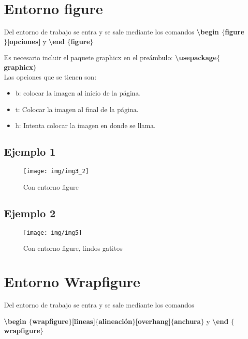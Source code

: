 \documentclass[11pt,letterpaper]{article}
\begin{document}
	\section{Entorno figure}
	Del entorno de trabajo se entra y se sale mediante los comandos \textbf{\textbackslash 		begin $\lbrace$figure$\rbrace$[opciones]} y \textbf{\textbackslash end $\lbrace$figure$		\rbrace$}
	
	Es necesario incluir el paquete graphicx en el preámbulo: \textbf{\textbackslash 			usepackage$\lbrace$graphicx$\rbrace$} \\
	
	Las opciones que se tienen son:
	\begin{itemize}
		\item b: colocar la imagen al inicio de la página. 
		\item t: Colocar la imagen al final de la página.
		\item h: Intenta colocar la imagen en donde se llama. 
	\end{itemize}
	
	\subsection{Ejemplo 1}
	\begin{figure}[h]
		\centering %
		\caption{Con entorno figure}
		\texttt{[image: img/img3\_2]}
	\end{figure}
	
	\subsection{Ejemplo 2}
	\begin{figure}[h]		
		\centering %
		\texttt{[image: img/img5]}
		\caption{Con entorno figure, lindos gatitos}
	\end{figure}


	\newpage	
	\section{Entorno Wrapfigure}
	Del entorno de trabajo se entra y se sale mediante los comandos
	
	 \textbf{\textbackslash begin $\lbrace$wrapfigure$\rbrace$[lineas]$\lbrace$alineación$\rbrace$[overhang]$\lbrace$anchura$\rbrace$} y \textbf{\textbackslash end $\lbrace$wrapfigure$\rbrace$} \\
	 
\end{document}
